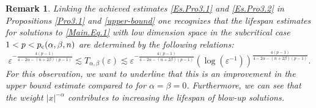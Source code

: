 \documentclass[11pt,reqno]{amsart}
\newtheorem{remark}{Remark}[section]
\begin{document}
   \begin{remark} \label{Remark3.1}
\selectfont
    Linking the achieved estimates \eqref{Es.Pro3.1} and \eqref{Es.Pro3.2} in Propositions \ref{Pro3.1} and \ref{upper-bound} one recognizes that the lifespan estimates for solutions to \eqref{Main.Eq.1} with low dimension space in the subcritical case $1 < p< p_{\rm c}(\alpha, \beta,n)$ are determined by the following relations:
    $$\varepsilon^{-\frac{4(p-1)}{4-2\alpha-(n+2\beta)(p-1)}} \lesssim T_{\alpha, \beta}(\varepsilon) \lesssim \varepsilon^{-\frac{4(p-1)}{4-2\alpha-(n+2\beta)(p-1)}} (\log(\varepsilon^{-1}))^{\frac{4(p-1)}{4-2\alpha-(n+2\beta)(p-1)}}.$$
For this observation, we want to underline that this is an improvement in the upper bound estimate compared to  \cite[Theorem 1.8]{Ikeda2019} for $\alpha =\beta= 0$. Furthermore, we can see that the weight $|x|^{-\alpha}$ contributes to increasing the lifespan of blow-up solutions.
\end{remark}



\end{document}
